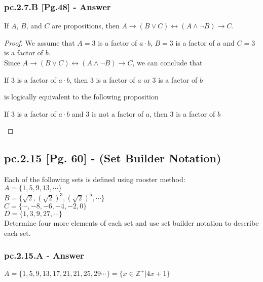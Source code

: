 \subsubsection*{pc.2.7.B [Pg.48] - Answer}

\begin{tcolorbox}
	\begin{theorem}
		If $A$, $B$, and $C$ are propositions, then $A \to (B \vee C) \leftrightarrow (A \wedge \neg B) \to C$.
	\end{theorem}
\end{tcolorbox} 
 
\begin{proof}
We assume that $A = 3$ is a factor of $a \cdot b$, $B = 3$ is a factor of $a$ and $C = 3$ is a factor of $b$. \\
Since $A \to (B \vee C) \leftrightarrow (A \wedge \neg B) \to C$, we can conclude that 
	\begin{center}
		If $3$ is a factor of $a \cdot b$, then $3$ is a factor of $a$ or $3$ is a factor of $b$
	\end{center}
is logically equivalent to the following proposition 
	\begin{center}
		If $3$ is a factor of $a \cdot b$ and $3$ is not a factor of $a$, then $3$ is a factor of $b$
	\end{center}
\end{proof}

\newpage
\subsection*{pc.2.15 [Pg. 60] - (Set Builder Notation)}
Each of the following sets is defined using rooster method: \\
$A = \{1, 5, 9, 13, \cdots \}$ \\
$B = \{\sqrt{2},(\sqrt{2})^3, (\sqrt{2})^5, \cdots \}$ \\
$C = \{\cdots, -8, -6, -4, -2, 0 \}$ \\
$D = \{1, 3, 9, 27,  \cdots \}$ \\
Determine four more elements of each set and use set builder notation to describe each set. \\

\subsubsection*{pc.2.15.A - Answer}
$A = \{1, 5, 9, 13,17, 21, 21, 25, 29 \cdots \} = \{ x \in \mathbb{Z^+}| 4x + 1\}$ 

